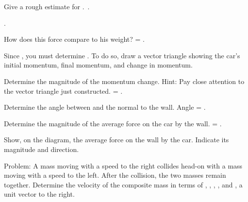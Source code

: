 {{\begin{one-digit-list}
\item [3.] Give a rough estimate for .
           \,\OneInchAnswer . 

\item [4.]  \OneInchAnswer . 

\item [5.] How does this force compare to his weight?
            = \OneInchAnswer . 
\end{one-digit-list}

\newline
{}

\begin{one-digit-list}
\item [1.] Since , you must
           determine .
           To do so, draw a vector triangle showing the car's initial momentum,
           final momentum, and change in momentum. 

\item [2.] Determine the magnitude of the momentum change.
           Hint: Pay close attention to the vector triangle just constructed.
            = \OneInchAnswer . 

\item [3.] Determine the angle between  and the normal to the
           wall.
           Angle = \OneInchAnswer . 

\item [4.] Determine the magnitude of the average force on the car by the wall.
            = \OneInchAnswer . 

\item [5.] Show, on the diagram, the average force on the wall by the car.
           Indicate its magnitude and direction. 
\end{one-digit-list}

\newline
Problem: A mass  moving with a speed  to the right collides head-on with
a mass  moving with a speed  to the left.
After the collision, the two masses remain together.
Determine the velocity  of the composite mass in terms of , , ,
, and , a unit vector to the right.

}}
